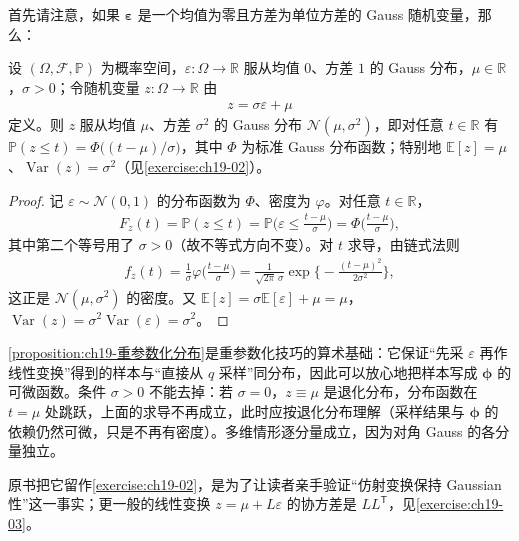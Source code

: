\documentclass[../../main.tex]{subfiles}
\begin{document}
首先请注意，如果 $\bm{\varepsilon}$ 是一个均值为零且方差为单位方差的 Gauss 随机变量，那么：

\begin{proposition}[重参数化采样的分布]\label{proposition:ch19-重参数化分布}
设 $(\Omega,\mathcal{F},\mathbb{P})$ 为概率空间，$\varepsilon:\Omega\to\mathbb{R}$ 服从均值 $0$、方差 $1$ 的 Gauss 分布，$\mu\in\mathbb{R}$，$\sigma>0$；令随机变量 $z:\Omega\to\mathbb{R}$ 由
\begin{align}
z=\sigma\varepsilon+\mu
\label{align:ch19-重参数化采样}
\end{align}
定义。则 $z$ 服从均值 $\mu$、方差 $\sigma^{2}$ 的 Gauss 分布 $\mathcal{N}(\mu,\sigma^{2})$，即对任意 $t\in\mathbb{R}$ 有 $\mathbb{P}(z\leqslant t)=\Phi\big((t-\mu)/\sigma\big)$，其中 $\Phi$ 为标准 Gauss 分布函数；特别地 $\mathbb{E}[z]=\mu$、$\operatorname{Var}(z)=\sigma^{2}$（见\cref{exercise:ch19-02}）。
\end{proposition}
\begin{proof}
记 $\varepsilon\sim\mathcal{N}(0,1)$ 的分布函数为 $\Phi$、密度为 $\varphi$。对任意 $t\in\mathbb{R}$，
\begin{align*}
F_z(t)=\mathbb{P}(z\leqslant t)=\mathbb{P}\Big(\varepsilon\leqslant\frac{t-\mu}{\sigma}\Big)=\Phi\Big(\frac{t-\mu}{\sigma}\Big),
\end{align*}
其中第二个等号用了 $\sigma>0$（故不等式方向不变）。对 $t$ 求导，由链式法则
\begin{align*}
f_z(t)=\frac{1}{\sigma}\varphi\Big(\frac{t-\mu}{\sigma}\Big)=\frac{1}{\sqrt{2\pi}\,\sigma}\exp\Big\{-\frac{(t-\mu)^{2}}{2\sigma^{2}}\Big\},
\end{align*}
这正是 $\mathcal{N}(\mu,\sigma^{2})$ 的密度。又 $\mathbb{E}[z]=\sigma\mathbb{E}[\varepsilon]+\mu=\mu$，$\operatorname{Var}(z)=\sigma^{2}\operatorname{Var}(\varepsilon)=\sigma^{2}$。
\end{proof}

\begin{remark}
\cref{proposition:ch19-重参数化分布}是重参数化技巧的算术基础：它保证“先采 $\varepsilon$ 再作线性变换”得到的样本与“直接从 $q$ 采样”同分布，因此可以放心地把样本写成 $\bm{\phi}$ 的可微函数。条件 $\sigma>0$ 不能去掉：若 $\sigma=0$，$z\equiv\mu$ 是退化分布，分布函数在 $t=\mu$ 处跳跃，上面的求导不再成立，此时应按退化分布理解（采样结果与 $\bm{\phi}$ 的依赖仍然可微，只是不再有密度）。多维情形逐分量成立，因为对角 Gauss 的各分量独立。

原书把它留作\cref{exercise:ch19-02}，是为了让读者亲手验证“仿射变换保持 Gaussian 性”这一事实；更一般的线性变换 $z=\mu+L\varepsilon$ 的协方差是 $LL^{\mathsf T}$，见\cref{exercise:ch19-03}。
\end{remark}
\end{document}
